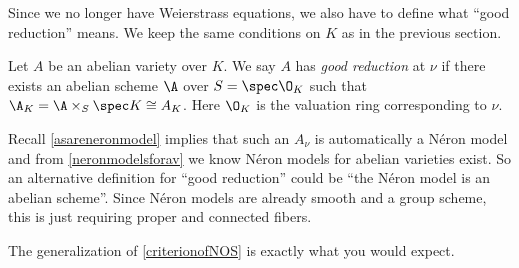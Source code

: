 \documentclass[11pt]{article}
\newcommand{\neron}{N\'{e}ron }
\begin{document}
Since we no longer have Weierstrass equations, we also have to define what ``good reduction'' means. We keep the same conditions on $K$ as in the previous section.
\begin{defn}
	Let $A$ be an abelian variety over $K$. We say $A$ has \emph{good reduction} at $\nu$ if there exists an abelian scheme $\A$ over $S = \spec\O_K$ such that $\A_K = \A\times_S \spec K \cong A_K$. Here $\O_K$ is the valuation ring corresponding to $\nu$.
\end{defn}

\begin{rem}\label{altgoodreduction}
	Recall \autoref{asareneronmodel} implies that such an $A_\nu$ is automatically a \neron model and from \autoref{neronmodelsforav} we know \neron models for abelian varieties exist. So an alternative definition for ``good reduction'' could be ``the \neron model is an abelian scheme''. Since \neron models are already smooth and a group scheme, this is just requiring proper and connected fibers.
\end{rem}

The generalization of \autoref{criterionofNOS} is exactly what you would expect.
\end{document}
